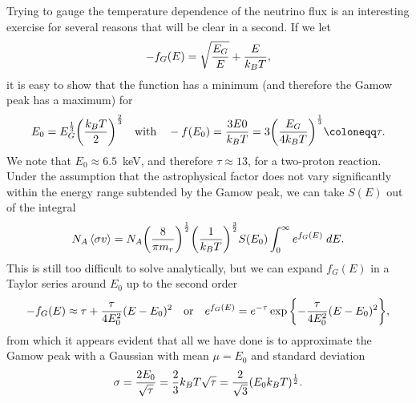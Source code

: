 Trying to gauge the temperature dependence of the neutrino flux is an interesting
exercise for several reasons that will be clear in a second. If we let
\begin{align*}
  -f_G(E) = \sqrt{\frac{E_G}{E}} + \frac{E}{k_B T},
\end{align*}
it is easy to show that the function has a minimum (and therefore the Gamow peak
has a maximum) for
\begin{align}
  E_0 = E_G^\frac{1}{3} \qty(\frac{\kB T}{2})^\frac{2}{3}
  \quad\text{with}\quad
  -f(E_0) = \frac{3E0}{\kB T} = 3 \qty(\frac{E_G}{4\kB T})^\frac{1}{3} \coloneqq \tau.
\end{align}
We note that $E_0 \approx 6.5$~keV, and therefore $\tau \approx 13$, for a two-proton reaction.
Under the assumption that the astrophysical factor does not vary significantly within
the energy range subtended by the Gamow peak, we can take $S(E)$ out of the integral
\begin{align*}
  N_A \left<\sigma v\right> = N_A \qty(\frac{8}{\pi m_r})^\frac{1}{2} \qty(\frac{1}{k_B T})^{\frac{3}{2}}
  S(E_0) \int_0^\infty e^{f_G(E)} \;d{E}.
\end{align*}
This is still too difficult to solve analytically, but we can expand $f_G(E)$ in a
Taylor series around $E_0$ up to the second order
\begin{align*}
  -f_G(E) \approx \tau + \frac{\tau}{4E_0^2} (E - E_0)^2
  \quad\text{or}\quad
  e^{f_G(E)} = e^{-\tau} \exp\qty{-\frac{\tau}{4E_0^2} (E - E_0)^2},
\end{align*}
from which it appears evident that all we have done is to approximate the Gamow
peak with a Gaussian with mean $\mu = E_0$ and standard deviation
\begin{align*}
  \sigma = \frac{2E_0}{\sqrt{\tau}} =
  \frac{2}{3} k_B T \sqrt{\tau} = \frac{2}{\sqrt{3}} (E_0 k_B T)^\frac{1}{2}.
\end{align*}

\begin{marginfigure}
  
  \caption{Illustration of the Gaussian approximation of the Gamow peak for
  $E_G = 600$~keV and $\kB T = 1.5$~keV.}
  \label{fig:gamow_peak_gaussian}
\end{marginfigure}

